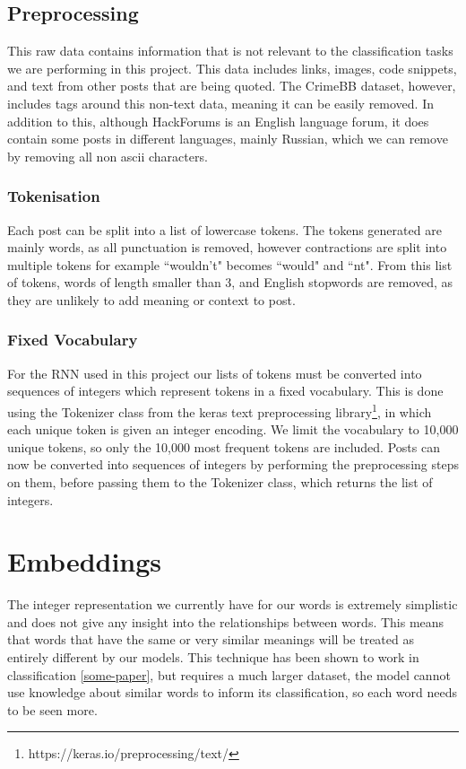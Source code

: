 \documentclass[12pt,a4paper,twoside,openright]{report}
\begin{document}
\subsection{Preprocessing}
This raw data contains information that is not relevant to the classification tasks we are performing in this project. This data includes links, images, code snippets, and text from other posts that are being quoted. The CrimeBB dataset, however, includes tags around this non-text data, meaning it can be easily removed. In addition to this, although HackForums is an English language forum, it does contain some posts in different languages, mainly Russian, which we can remove by removing all non ascii characters. 

\subsubsection{Tokenisation}
Each post can be split into a list of lowercase tokens. The tokens generated are mainly words, as all punctuation is removed, however contractions are split into multiple tokens for example ``wouldn't" becomes ``would" and ``nt". From this list of tokens, words of length smaller than 3, and English stopwords are removed, as they are unlikely to add meaning or context to post.

\subsubsection{Fixed Vocabulary}
For the RNN used in this project our lists of tokens must be converted into sequences of integers which represent tokens in a fixed vocabulary. This is done using the Tokenizer class from the keras text preprocessing library\footnote{https://keras.io/preprocessing/text/}, in which each unique token is given an integer encoding. We limit the vocabulary to 10,000 unique tokens, so only the 10,000 most frequent tokens are included. Posts can now be converted into sequences of integers by performing the preprocessing steps on them, before passing them to the Tokenizer class, which returns the list of integers.

\section{Embeddings}
The integer representation we currently have for our words is extremely simplistic and does not give any insight into the relationships between words. This means that words that have the same or very similar meanings will be treated as entirely different by our models. This technique has been shown to work in classification \ref{some-paper}, but requires a much larger dataset, the model cannot use knowledge about similar words to inform its classification, so each word needs to be seen more. 
\newline 
\end{document}
